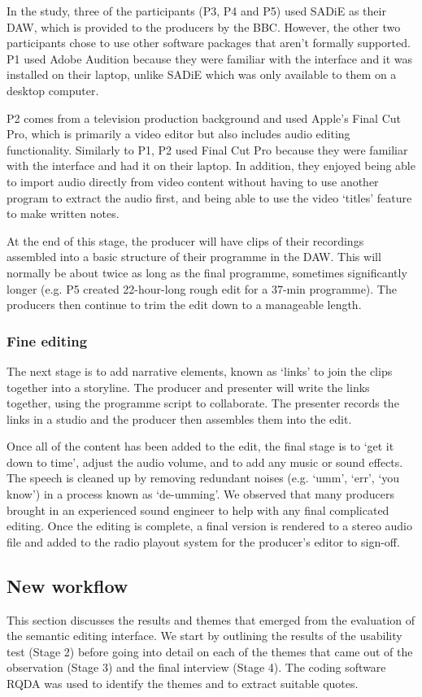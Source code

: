 In the study, three of the participants (P3, P4 and P5) used SADiE as their DAW, which is provided to the producers by
the BBC. However, the other two participants chose to use other software packages that aren't formally supported. P1
used Adobe Audition because they were familiar with the interface and it was installed on their laptop, unlike SADiE
which was only available to them on a desktop computer.

P2 comes from a television production background and used Apple's Final Cut Pro, which is primarily a video editor but
also includes audio editing functionality.  Similarly to P1, P2 used Final Cut Pro because they were familiar with the
interface and had it on their laptop. In addition, they enjoyed being able to import audio directly from video content
without having to use another program to extract the audio first, and being able to use the video `titles' feature to
make written notes.

At the end of this stage, the producer will have clips of their recordings assembled into a basic structure of their
programme in the DAW. This will normally be about twice as long as the final programme, sometimes significantly longer
(e.g. P5 created 22-hour-long rough edit for a 37-min programme). The producers then continue to trim the edit down to
a manageable length.

\subsubsection{Fine editing}
The next stage is to add narrative elements, known as `links' to join the clips together into a storyline. The producer
and presenter will write the links together, using the programme script to collaborate. The presenter records the links
in a studio and the producer then assembles them into the edit.

Once all of the content has been added to the edit, the final stage is to `get it down to time', adjust the audio
volume, and to add any music or sound effects. The speech is cleaned up by removing redundant noises (e.g.  `umm',
`err', `you know') in a process known as `de-umming'. We observed that many producers brought in an experienced sound
engineer to help with any final complicated editing.  Once the editing is complete, a final version is rendered to a
stereo audio file and added to the radio playout system for the producer's editor to sign-off.

\subsection{New workflow}\label{sec:screen-results-new}
This section discusses the results and themes that emerged from the evaluation of the semantic editing interface. We
start by outlining the results of the usability test (Stage 2) before going into detail on each of the themes that came
out of the observation (Stage 3) and the final interview (Stage 4).  The coding software RQDA was used to identify the
themes and to extract suitable quotes.

